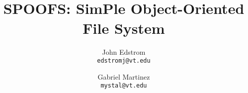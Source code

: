 \documentclass[10pt,onecolumn,letterpaper]{article}
\begin{document}
\title{\LARGE~\\[-8.0ex] SPOOFS: SimPle Object-Oriented File System}
\author{John Edstrom\\
    \texttt{edstromj@vt.edu} \and
    Gabriel Martinez\\
    \texttt{mystal@vt.edu}}


\date{}
\maketitle










\begin{footnotesize}


\end{footnotesize}
\end{document}
